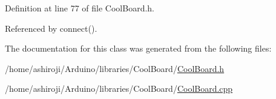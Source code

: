 Definition at line 77 of file Cool\+Board.\+h.



Referenced by connect().



The documentation for this class was generated from the following files\+:\begin{DoxyCompactItemize}
\item 
/home/ashiroji/\+Arduino/libraries/\+Cool\+Board/\hyperlink{CoolBoard_8h}{Cool\+Board.\+h}\item 
/home/ashiroji/\+Arduino/libraries/\+Cool\+Board/\hyperlink{CoolBoard_8cpp}{Cool\+Board.\+cpp}\end{DoxyCompactItemize}
